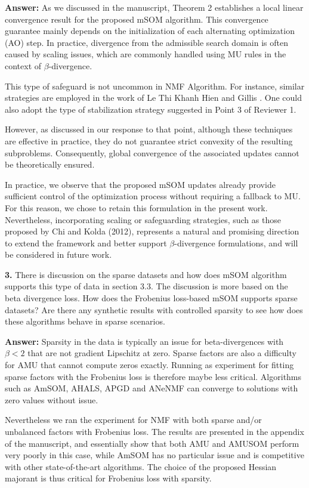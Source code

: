 \documentclass[10pt]{article} %
\newcommand{\answer}[1]{{\textbf{Answer:} \color{blue} #1}}
\begin{document}
\answer{As we discussed in the manuscript, Theorem 2 establishes a local linear convergence result for the proposed mSOM algorithm. This convergence guarantee mainly depends on the initialization of each alternating optimization (AO) step. In practice, divergence from the admissible search domain is often caused by scaling issues, which are commonly handled using MU rules in the context of $\beta$-divergence.

This type of safeguard is not uncommon in NMF Algorithm. For instance, similar strategies are employed in the work of Le Thi Khanh Hien and Gillis \cite{hien2021algorithms}. One could also adopt the type of stabilization strategy suggested in Point 3 of Reviewer 1. 

However, as discussed in our response to that point, although these techniques are effective in practice, they do not guarantee strict convexity of the resulting subproblems. Consequently, global convergence of the associated updates cannot be theoretically ensured.

In practice, we observe that the proposed mSOM updates already provide sufficient control of the optimization process without requiring a fallback to MU. For this reason, we chose to retain this formulation in the present work. Nevertheless, incorporating scaling or safeguarding strategies, such as those proposed by Chi and Kolda (2012), represents a natural and promising direction to extend the framework and better support $\beta$-divergence formulations, and will be considered in future work.}

\textbf{3.} There is discussion on the sparse datasets and how does mSOM algorithm supports this type of data in section 3.3. The discussion is more based on the beta divergence loss. How does the Frobenius loss-based mSOM supports sparse datasets? Are there any synthetic results with controlled sparsity to see how does these algorithms behave in sparse scenarios.

\answer{
Sparsity in the data is typically an issue for beta-divergences with $\beta<2$ that are not gradient Lipschitz at zero. Sparse factors are also a difficulty for AMU that cannot compute zeros exactly. Running as experiment for fitting sparse factors with the Frobenius loss is therefore maybe less critical. Algorithms such as AmSOM, AHALS, APGD and ANeNMF can converge to solutions with zero values without issue.

Nevertheless we ran the experiment for NMF with both sparse and/or unbalanced factors with Frobenius loss. The results are presented in the appendix of the manuscript, and essentially show that both AMU and AMUSOM perform very poorly in this case, while AmSOM has no particular issue and is competitive with other state-of-the-art algorithms. The choice of the proposed Hessian majorant is thus critical for Frobenius loss with sparsity.
}
\end{document}
